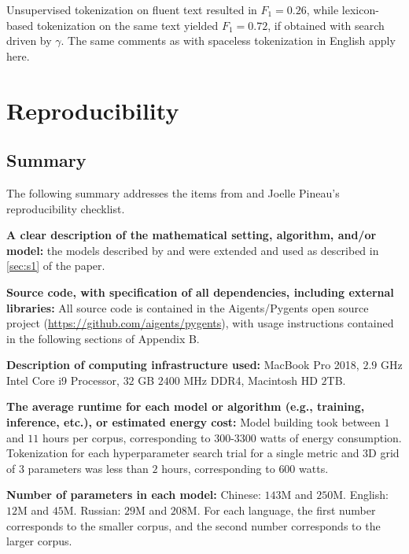 \documentclass[11pt]{article}
\begin{document}
Unsupervised tokenization on fluent text resulted in $F_1=0.26$, while lexicon-based tokenization on the same text yielded $F_1=0.72$, if obtained with search driven by $\gamma$. The same comments as with spaceless tokenization in English apply here.

\section{Reproducibility}

\subsection{Summary}

The following summary addresses the items from \citet{19} and Joelle Pineau’s reproducibility checklist.

\textbf{A clear description of the mathematical setting, algorithm, and/or model:} the models described by \citet{11} and \citet{12} were extended and used as described in \autoref{sec:s1} of the paper.

\textbf{Source code, with specification of all dependencies, including external libraries:} All source code is contained in the Aigents/Pygents open source project (\url{https://github.com/aigents/pygents}), with usage instructions contained in the following sections of Appendix B. 

\textbf{Description of computing infrastructure used:} MacBook Pro 2018, $2.9$ GHz Intel Core i9 Processor, $32$ GB $2400$ MHz DDR4, Macintosh HD $2$TB.

\textbf{The average runtime for each model or algorithm (e.g., training, inference, etc.), or estimated energy cost:} Model building took between $1$ and $11$ hours per corpus, corresponding to $300$-$3300$ watts of energy consumption. Tokenization for each hyperparameter search trial for a single metric and 3D grid of $3$ parameters was less than $2$ hours, corresponding to $600$ watts.

\textbf{Number of parameters in each model:} Chinese: $143$M and $250$M. English: $12$M and $45$M. Russian: $29$M and $208$M. For each language, the first number corresponds to the smaller corpus, and the second number corresponds to the larger corpus.
\end{document}
